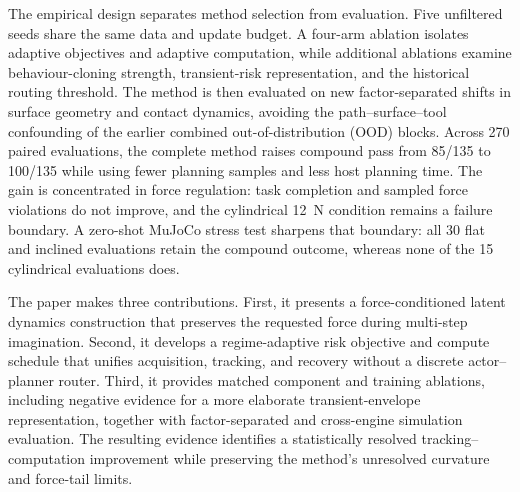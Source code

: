 The empirical design separates method selection from evaluation. Five
unfiltered seeds share the same data and update budget. A four-arm ablation
isolates adaptive objectives and adaptive computation, while additional
ablations examine behaviour-cloning strength, transient-risk representation,
and the historical routing threshold. The method is then evaluated on new
factor-separated shifts in surface geometry and contact dynamics, avoiding
the path--surface--tool confounding of the earlier combined
out-of-distribution (OOD) blocks. Across 270 paired evaluations, the complete
method raises compound pass from 85/135 to
100/135 while using fewer planning samples and less host planning time. The
gain is concentrated in force regulation: task completion and sampled force
violations do not improve, and the cylindrical 12~N condition remains a
failure boundary. A zero-shot MuJoCo stress test sharpens that boundary: all
30 flat and inclined evaluations retain the compound outcome, whereas none of
the 15 cylindrical evaluations does.

The paper makes three contributions. First, it presents a force-conditioned
latent dynamics construction that preserves the requested force during
multi-step imagination. Second, it develops a regime-adaptive risk objective
and compute schedule that unifies acquisition, tracking, and recovery without
a discrete actor--planner router. Third, it provides matched component and
training ablations, including negative evidence for a more elaborate
transient-envelope representation, together with factor-separated and
cross-engine simulation evaluation. The resulting evidence identifies a
statistically resolved tracking--computation improvement while preserving the
method's unresolved curvature and force-tail limits.
